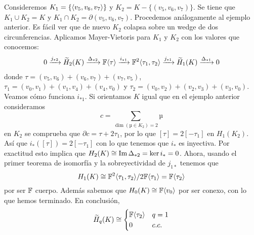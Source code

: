 \documentclass[HS.tex]{subfiles}
\begin{document}
\begin{ej}
Consideremos $K_1=\{\langle{v_5,v_6,v_7}\rangle\}$ y $K_2=K-\{(v_5,v_6,v_7)\}$. Se tiene que $K_1\cup K_2=K$ y $K_1\cap K_2=\partial(v_5,v_6,v_7)$. Procedemos análogamente al ejemplo anterior. Es fácil ver que de nuevo $K_2$ colapsa sobre un wedge de dos circunferencias. Aplicamos Mayer-Vietoris para $K_1$ y $K_2$ con los valores que conocemos:
\begin{align*}
 0 \xrightarrow{j_{*2}} \widetilde{H}_2(K) \xrightarrow{\Delta_{*2}} \mathbb{F}\langle{\tau}\rangle
 \xrightarrow{i_{*1}} \mathbb{F}^2\langle{\tau_1,\tau_2}\rangle \xrightarrow{j_{*1}} \widetilde{H}_1(K) \xrightarrow{\Delta_{*1}} 0 
\end{align*}
donde $\tau=(v_5,v_6)+(v_6,v_7)+(v_7,v_5)$, $\tau_1=(v_0,v_1)+(v_1,v_4)+(v_4,v_0)$ y $\tau_2=(v_0,v_2)+(v_2,v_3)+(v_3,v_0)$. Veamos cómo funciona $i_{*1}$. Si orientamos $K$ igual que en el ejemplo anterior consideramos 
\[ c = \sum_{\dim(µ \in K_2)=2} µ \]
en $K_2$ se comprueba que $\partial c=\tau+2\tau_1$, por lo que $[\tau]=2[-\tau_1]$ en $H_1(K_2)$. Así que $i_*([\tau])=2[-\tau_1]$ con lo que tenemos que  $i_*$ es inyectiva. Por exactitud esto implica que $H_2(K)\cong\operatorname{Im}\Delta_{*2}=\ker i_*=0$. Ahora, usando el primer teorema de isomorfía y la sobreyectividad de $j_{1*}$ tenemos que
\[
H_1(K)\cong \mathbb{F}^2\langle{\tau_1,\tau_2}\rangle/2\mathbb{F}\langle{\tau_1}\rangle=\mathbb{F}\langle{\tau_2}\rangle
\]
por ser $\mathbb{F}$ cuerpo. Además sabemos que $H_0(K)\cong\mathbb{F}\langle{v_0}\rangle$ por ser conexo, con lo que hemos terminado. En conclusión, 
$$\widetilde{H}_q(K)\cong \begin{cases}
\mathbb{F}\langle{\tau_2}\rangle & q=1\\
0 & c.c.
\end{cases}$$
\end{ej}
\end{document}
